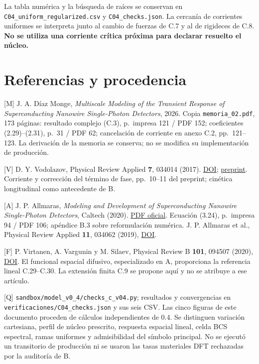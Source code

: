 \documentclass[
  spanish,
  10pt,
  a4paper,
]{article}
\begin{document}
La tabla numérica y la búsqueda de raíces se conservan en
\nolinkurl{C04_uniform_regularized.csv} y \nolinkurl{C04_checks.json}. La
cercanía de corrientes uniformes se interpreta junto al cambio de
fuerzas de C.7 y al de rigideces de C.8. \textbf{No se utiliza una
corriente crítica próxima para declarar resuelto el núcleo.}

\section{Referencias y procedencia}\label{referencias-y-procedencia}

{[}M{]} J. A. Díaz Monge, \emph{Multiscale Modeling of the Transient
Response of Superconducting Nanowire Single-Photon Detectors}, 2026.
Copia \nolinkurl{memoria_02.pdf}, 173 páginas: resultado complejo (C.3),
p.~impresa 121 / PDF 152; coeficientes (2.29)--(2.31), p.~31 / PDF 62;
cancelación de corriente en anexo C.2, pp.~121--123. La derivación de la
memoria se conserva; no se modifica su implementación de producción.

{[}V{]} D. Y. Vodolazov, Physical Review Applied \textbf{7}, 034014
(2017). \href{https://doi.org/10.1103/PhysRevApplied.7.034014}{DOI};
\href{https://arxiv.org/pdf/1611.06060}{preprint}. Corriente y
corrección del término de fase, pp.~10--11 del preprint; cinética
longitudinal como antecedente de B.

{[}A{]} J. P. Allmaras, \emph{Modeling and Development of
Superconducting Nanowire Single-Photon Detectors}, Caltech (2020).
\href{https://thesis.caltech.edu/13748/08/Allmaras_Thesis_Final.pdf}{PDF
oficial}. Ecuación (3.24), p.~impresa 94 / PDF 106; apéndice B.3 sobre
reformulación numérica. J. P. Allmaras et al., Physical Review Applied
\textbf{11}, 034062 (2019),
\href{https://doi.org/10.1103/PhysRevApplied.11.034062}{DOI}.

{[}F{]} P. Virtanen, A. Vargunin y M. Silaev, Physical Review B
\textbf{101}, 094507 (2020),
\href{https://doi.org/10.1103/PhysRevB.101.094507}{DOI}. El funcional
espacial difusivo, especializado en A, proporciona la referencia lineal
C.29--C.30. La extensión finita C.9 se propone aquí y no se atribuye a
ese artículo.

{[}Q{]} \nolinkurl{sandbox/model_v0_4/checks_c_v04.py}; resultados y
convergencias en \nolinkurl{verificaciones/C04_checks.json} y sus seis
CSV. Las cinco figuras de este documento proceden de cálculos
independientes de 0.4. Se distinguen variación cartesiana, perfil de
núcleo prescrito, respuesta espacial lineal, celda BCS espectral, ramas
uniformes y admisibilidad del símbolo principal. No se ejecutó un
transitorio de producción ni se usaron las tasas materiales DFT
rechazadas por la auditoría de B.
\end{document}
